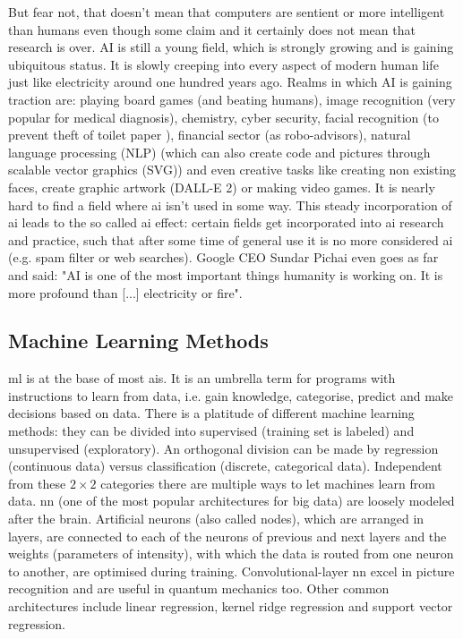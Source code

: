 But fear not, that doesn't mean that computers are sentient or more intelligent than humans\cite{searle1980,searle1999married} even though some claim\cite{tiku2022google} and it certainly does not mean that research is over. 
AI is still a young field, which is strongly growing and is gaining ubiquitous status. 
It is slowly creeping into every aspect of modern human life just like electricity around one hundred years ago. 
Realms in which AI is gaining traction are: 
%
playing board games (and beating humans)\cite{Silver2017,Feng1999,Campbell2002}, 
image recognition (very popular for medical diagnosis)\cite{Li2020,Deo2015,Topol2019,Fujiyoshi2019}, 
chemistry\cite{Westermayr2019,goh2017chemception,jha2018elemnet}, 
cyber security\cite{Sarker2021},
facial recognition (to prevent theft of toilet paper \cite{Andrews2017}),
financial sector (as robo-advisors)\cite{Littman2021},
natural language processing (NLP)\cite{Koroteev2021,Liu2021gpt,Parviainen2021} 
(which can also create code and pictures through scalable vector graphics (SVG))
and even creative tasks like 
creating non existing faces\cite{Mansourifar2020}, 
create graphic artwork (DALL-E 2)\cite{Marcus2022} or 
making video games\cite{Guzdial2016}.
%
It is nearly hard to find a field where \gls{ai} isn't used in some way. 
This steady incorporation of \gls{ai} leads to the so called \gls{ai} effect\cite{McCorduck1982,ai100}: 
certain fields get incorporated into \gls{ai} research and practice,
such that after some time of general use it is no more considered \gls{ai} (e.g. spam filter or web searches).
Google CEO Sundar Pichai even goes as far and said: 
"AI is one of the most important things humanity is working on. It is more profound than [...] electricity or fire"\cite{Hassan2020}.

%
\subsection{Machine Learning Methods}
%
\Gls{ml} is at the base of most \gls{ai}s.
It is an umbrella term for programs with instructions to learn from data, i.e. gain knowledge, categorise, predict and make decisions based on data. 
%
There is a platitude of different machine learning methods: 
they can be divided into supervised (training set is labeled) and unsupervised (exploratory).  
An orthogonal division can be made by regression (continuous data) versus classification (discrete, categorical data). 
Independent from these $2\times2$ categories there are multiple ways to let machines learn from data.
%
\Gls{nn} (one of the most popular architectures for big data\cite{Chiroma2019}) are loosely modeled after the brain\cite{bishop1994neural}.
Artificial neurons (also called nodes), which are arranged in layers, 
are connected to each of the neurons of previous and next layers
and the weights (parameters of intensity), with which the data is routed from one neuron to another, 
are optimised during training. 
%
Convolutional-layer \gls{nn} excel in picture recognition\cite{Lecun1995conv} and are useful in quantum mechanics too\cite{westermayr2020combining}.
Other common architectures include linear regression, kernel ridge regression and support vector regression.

